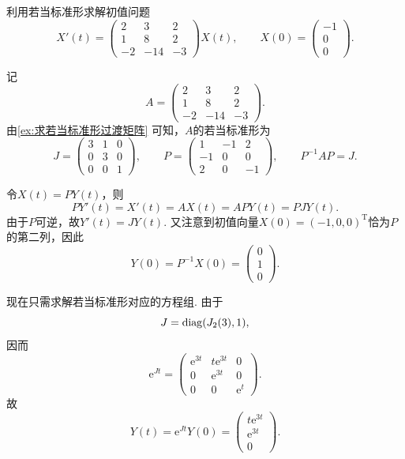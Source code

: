 \begin{example}{}{}
    利用若当标准形求解初值问题
    \[
        X'(t)=\begin{pmatrix}
            2 & 3 & 2 \\ 1 & 8 & 2 \\ -2 & -14 & -3
        \end{pmatrix}X(t),\qquad
        X(0)=\begin{pmatrix}
            -1 \\ 0 \\ 0
        \end{pmatrix}.
    \]
\end{example}
\begin{solution}
    记
    \[
        A=\begin{pmatrix}
            2 & 3 & 2 \\ 1 & 8 & 2 \\ -2 & -14 & -3
        \end{pmatrix}.
    \]
    由\autoref{ex:求若当标准形过渡矩阵} 可知，$A$的若当标准形为
    \[
        J=\begin{pmatrix}
            3 & 1 & 0 \\ 0 & 3 & 0 \\ 0 & 0 & 1
        \end{pmatrix},
        \qquad
        P=\begin{pmatrix}
            1 & -1 & 2 \\ -1 & 0 & 0 \\ 2 & 0 & -1
        \end{pmatrix},
        \qquad
        P^{-1}AP=J.
    \]

    令$X(t)=PY(t)$，则
    \[
        PY'(t)=X'(t)=AX(t)=APY(t)=PJY(t).
    \]
    由于$P$可逆，故$Y'(t)=JY(t)$. 又注意到初值向量$X(0)=(-1,0,0)^\mathrm{T}$恰为$P$的第二列，因此
    \[
        Y(0)=P^{-1}X(0)=\begin{pmatrix}
            0 \\ 1 \\ 0
        \end{pmatrix}.
    \]

    现在只需求解若当标准形对应的方程组. 由于
    \[
        J=\operatorname{diag}(J_2(3),1),
    \]
    因而
    \[
        \mathrm{e}^{Jt}=\begin{pmatrix}
            \mathrm{e}^{3t} & t\mathrm{e}^{3t} & 0 \\
            0 & \mathrm{e}^{3t} & 0 \\
            0 & 0 & \mathrm{e}^{t}
        \end{pmatrix}.
    \]
    故
    \[
        Y(t)=\mathrm{e}^{Jt}Y(0)=\begin{pmatrix}
            t\mathrm{e}^{3t} \\ \mathrm{e}^{3t} \\ 0
        \end{pmatrix}.
    \]


\end{solution}
